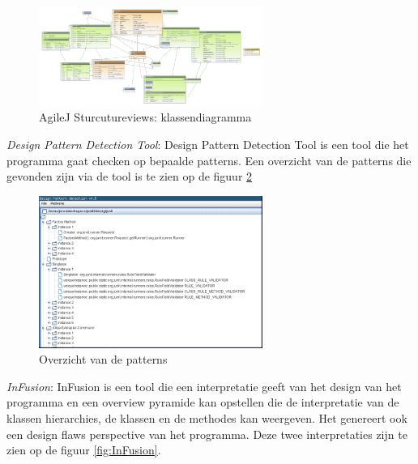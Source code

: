 \documentclass[i1]{oss}
\begin{document}
\begin{description}
\begin{figure}[hb!]
	\centering
	\includegraphics[width=0.65\textwidth]{AgileJKlassendiagramma}
	\caption{AgileJ Sturcutureviews: klassendiagramma}
	\label{fig:AgileJKlassendia}
\end{figure}

\item \emph{Design Pattern Detection Tool}: Design Pattern Detection Tool is een tool die het programma gaat checken op bepaalde patterns. Een overzicht van de patterns die gevonden zijn via de tool is te zien op de figuur \ref{fig:DesignPatterns}

\begin{figure}[hb!]
	\centering
	\includegraphics[width=0.65\textwidth]{Patterns1}
	\caption{Overzicht van de patterns}
	\label{fig:DesignPatterns}
\end{figure}

\item \emph{InFusion}: InFusion is een tool die een interpretatie geeft van het design van het programma en een overview pyramide kan opstellen die de interpretatie van de klassen hierarchies, de klassen en de methodes kan weergeven. Het genereert ook een design flaws perspective van het programma. Deze twee interpretaties zijn te zien op de figuur \ref{fig:InFusion}.


\end{description}
\end{document}
